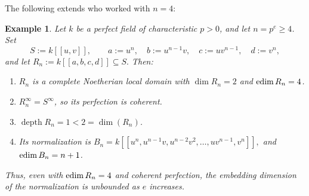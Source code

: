 \documentclass[11pt,a4paper]{amsart}
\numberwithin{equation}{section}
\newtheorem{example}[theorem]{Example}\newtheorem{notation}[theorem]{Notation}
\newcommand{\depth}{\operatorname{depth}}\newcommand{\Gr}{\operatorname{Gr}}
\begin{document}
 The following extends \cite[Example 3.5]{Shim} who worked with $n=4$:
 
 
 
 
 \begin{example}\label{thm:nonCM}	Let $k$ be a perfect field of characteristic $p>0$, and let	$n=p^e\geq4$. Set	$$	S:=k[[u,v]],\qquad
 	a:=u^n,\quad b:=u^{n-1}v,\quad c:=uv^{n-1},\quad d:=v^n,	$$	and let
$	R_n:=k[[a,b,c,d]]\subseteq S.$	Then:	\begin{enumerate}	\item $R_n$ is a complete Noetherian local domain with	$\dim R_n=2$ and $\operatorname{edim} R_n=4$.	\item $R_n^\infty=S^\infty$, so its perfection is coherent.	\item $\depth R_n=1<2=\dim(R_n)$.
 		\item Its normalization is
$B_n=k[[u^n,u^{n-1}v,u^{n-2}v^2,\ldots,uv^{n-1},v^n]], $	and $\operatorname{edim} B_n=n+1$.
 	\end{enumerate}
 	Thus, even with $\operatorname{edim} R_n=4$ and coherent perfection, the
 	embedding dimension of the normalization is unbounded as $e$
 	increases.
 \end{example}
 
\end{document}
